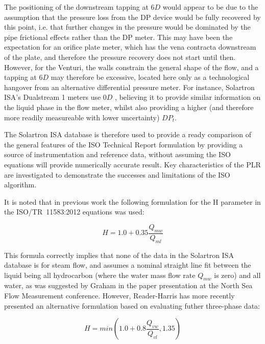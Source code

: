 \documentclass[journal]{IEEEtran}
\begin{document}
The positioning of the downstream tapping at $6D$ would appear to be due to the assumption that the pressure loss from the DP device would be fully recovered by this point, i.e. that further changes in the pressure would be dominated by the pipe frictional effects rather than the DP meter.  This may have been the expectation for an orifice plate meter, which has the vena contracta downstream of the plate, and therefore the pressure recovery does not start until then.  However, for the Venturi, the walls constrain the general shape of the flow, and a tapping at $6D$ may therefore be excessive, located here only as a technological hangover from an alternative differential pressure meter.  For instance, Solartron ISA's Dualstream 1 meters use $0D$ \cite{Collins2017PLR1}, believing it to provide similar information on the liquid phase in the flow meter, whilst also providing a higher (and therefore more readily measureable with lower uncertainty) $DP_{t}$.

The Solartron ISA database is therefore used to provide a ready comparison of the general features of the ISO Technical Report formulation by providing a source of instrumentation and reference data, without assuming the ISO equations will provide numerically accurate result.  Key characteristics of the PLR are investigated to demonstrate the successes and limitations of the ISO algorithm.

It is noted that in previous work \cite{Collins2015} the following formulation for the \acrshort{H} parameter in the ISO/TR~11583:2012 \cite{2012ISO/TRConduits} equations was used:

\begin{equation}
H = 1.0 + 0.35 \frac{Q_{mw}}{Q_{ml}}    
\end{equation}

This formula correctly implies that none of the data in the Solartron ISA database is for steam flow, and assumes a nominal straight line fit between the liquid being all hydrocarbon (where the water mass flow rate $Q_{mw}$ is zero) and all water, as was suggested by Graham in the paper presentation at the North Sea Flow Measurement conference.  However, Reader-Harris has more recently presented an alternative formulation \cite{Reader-Harris2017} based on evaluating futher three-phase data:

\begin{equation}
H = min \left( 1.0 + 0.8 \frac{Q_{vw}}{Q_{vl}}, 1.35 \right)    
\end{equation}
\end{document}

